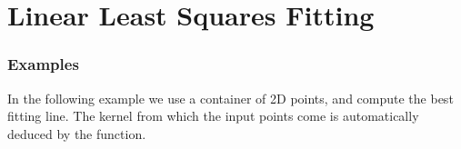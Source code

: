 \chapter{Linear Least Squares Fitting}
\label{chap:pca}


\minitoc


% 

\subsection{Examples}
\label{subsec:pca_examples}

In the following example we use a \stl container of 2D points, and
compute the best fitting line. The kernel from which the input points
come is automatically deduced by the function.




